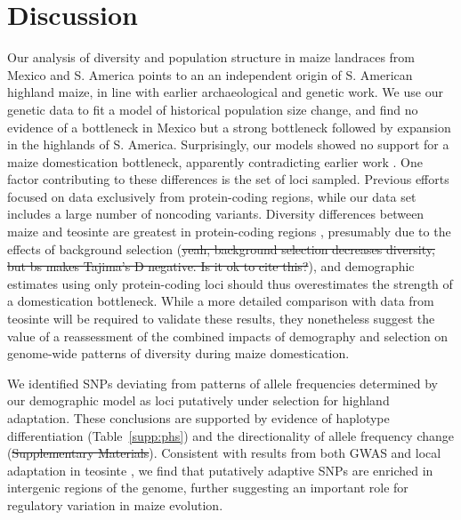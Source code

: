 \section*{Discussion}

Our analysis of diversity and population structure in maize landraces from Mexico and S. America points to an  an independent origin of S. American highland maize, in line with earlier archaeological \cite[]{Piperno_2006_69,Perry_2006_16511492,Grobman_2012_22307642} and genetic \citep{vanHeerwaarden_2011_21189301} work. 
We use our genetic data to fit a model of historical population size change, and find no evidence of a bottleneck in Mexico but a strong bottleneck followed by expansion in the highlands of S. America. 
Surprisingly, our models showed no support for a maize domestication bottleneck, apparently contradicting earlier work \cite[]{Eyre-Walker_1998_9539756,Tenaillon_2004_15014173,Wright_2005_15919994}. 
One factor contributing to these differences is the set of loci sampled. 
Previous efforts focused on data exclusively from protein-coding regions, while our data set includes a large number of noncoding variants.
Diversity differences between maize and teosinte are greatest in protein-coding regions \citep{Hufford_2012_22660546}, presumably due to the effects of background selection \citep{Charlesworth_1993_8375663} (\st{yeah, background selection decreases diversity, but bs makes Tajima's D negative. Is it ok to cite this?}), and demographic estimates using only protein-coding loci should thus overestimates the strength of a domestication bottleneck.
While a more detailed comparison with data from teosinte will be required to validate these results, they nonetheless suggest the value of a reassessment of the combined impacts of demography and selection on genome-wide patterns of diversity during maize domestication.

We identified SNPs deviating from patterns of allele frequencies determined by our demographic model as loci putatively under selection for highland adaptation.
These conclusions are supported by evidence of haplotype differentiation (Table~\ref{supp:phs}) and the directionality of allele frequency change (\st{Supplementary Materials}).
Consistent with results from both GWAS \citep{Wallace_2014_25474422} and local adaptation in teosinte \citep{Pyhajarvi2013}, we find that putatively adaptive SNPs are enriched in intergenic regions of the genome, further suggesting an important role for regulatory variation in maize evolution. 

